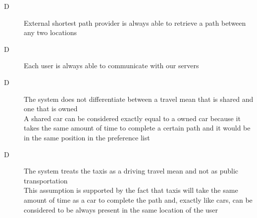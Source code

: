 \begin{description}
\item[D\thecountDom]  External shortest path provider is always able to retrieve a path between any two locations

\item[D\thecountDom] Each user is always able to communicate with our servers

\item[D\thecountDom] The system does not differentiate between a travel mean that is shared and one that is owned \\ [0.1cm]
\small{A shared car can be considered exactly equal to a owned car because it takes the same amount of time to complete a certain path and it would be in the same position in the preference list}
\normalsize

\item[D\thecountDom] The system treats the taxis as a driving travel mean and not as public transportation \\ [0.1cm]
This assumption is supported by the fact that taxis will take the same amount of time as a car to complete the path and, exactly like cars, can be considered to be always present in the same location of the user
\end{description}
